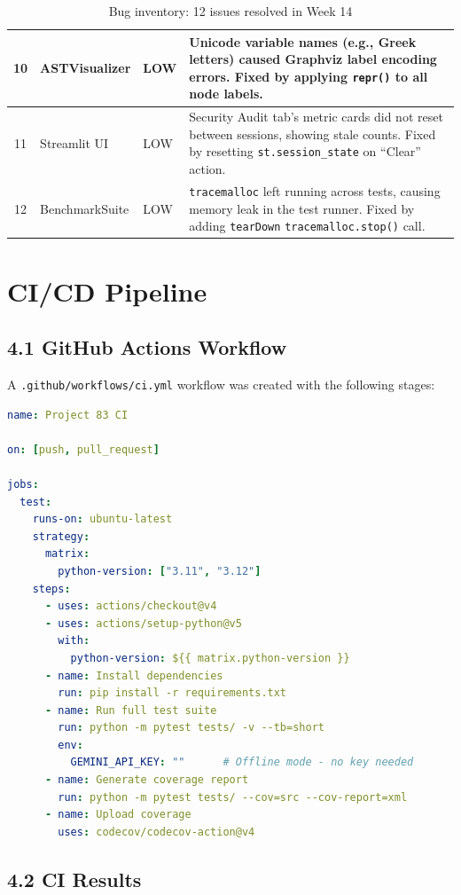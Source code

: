 \documentclass[a4paper,11pt]{article}
\begin{document}
\begin{table}[h]
\begin{tabularx}{\textwidth}{|c|l|l|X|}
\hline
10 & ASTVisualizer & LOW & Unicode variable names (e.g., Greek letters) caused Graphviz label encoding errors. Fixed by applying \texttt{repr()} to all node labels. \\
\hline
11 & Streamlit UI & LOW & Security Audit tab's metric cards did not reset between sessions, showing stale counts. Fixed by resetting \texttt{st.session\_state} on ``Clear'' action. \\
\hline
12 & BenchmarkSuite & LOW & \texttt{tracemalloc} left running across tests, causing memory leak in the test runner. Fixed by adding \texttt{tearDown} \texttt{tracemalloc.stop()} call. \\
\hline
\end{tabularx}
\caption{Bug inventory: 12 issues resolved in Week 14}
\end{table}

\section{CI/CD Pipeline}

\subsection{4.1 GitHub Actions Workflow}

A \texttt{.github/workflows/ci.yml} workflow was created with the following stages:

\begin{lstlisting}[language=yaml, caption=GitHub Actions CI pipeline]
name: Project 83 CI

on: [push, pull_request]

jobs:
  test:
    runs-on: ubuntu-latest
    strategy:
      matrix:
        python-version: ["3.11", "3.12"]
    steps:
      - uses: actions/checkout@v4
      - uses: actions/setup-python@v5
        with:
          python-version: ${{ matrix.python-version }}
      - name: Install dependencies
        run: pip install -r requirements.txt
      - name: Run full test suite
        run: python -m pytest tests/ -v --tb=short
        env:
          GEMINI_API_KEY: ""      # Offline mode - no key needed
      - name: Generate coverage report
        run: python -m pytest tests/ --cov=src --cov-report=xml
      - name: Upload coverage
        uses: codecov/codecov-action@v4
\end{lstlisting}

\subsection{4.2 CI Results}
\end{document}
